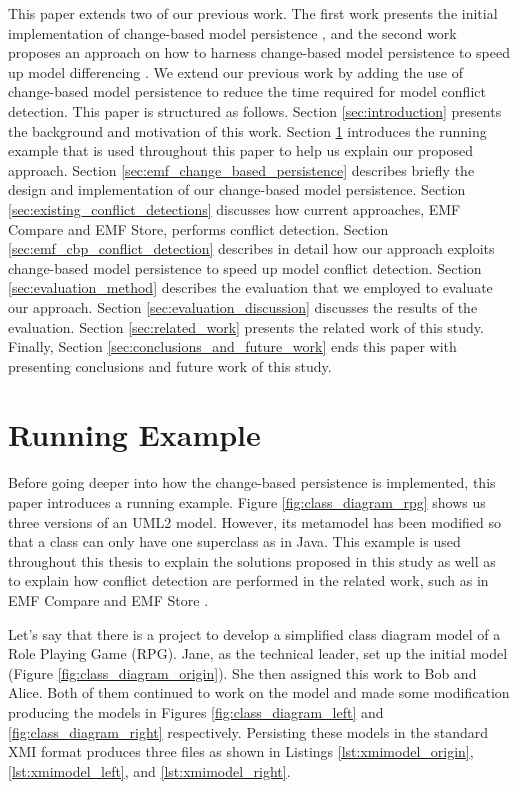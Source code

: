 This paper extends two of our previous work. The first work presents the initial implementation of change-based model persistence \cite{DBLP:conf/models/YohannisKP17}, and the second work proposes an approach on how to harness change-based model persistence to speed up model differencing \cite{yohannis2019efficient}. We extend our previous work by adding the use of change-based model persistence to reduce the time required for model conflict detection. This paper is structured as follows. Section \ref{sec:introduction} presents the background and motivation of this work. Section \ref{sec:running_example} introduces the running example that is used throughout this paper to help us explain our proposed approach. Section \ref{sec:emf_change_based_persistence} describes briefly the design and  implementation of our change-based model persistence.  
Section \ref{sec:existing_conflict_detections} discusses how current approaches, EMF Compare and EMF Store, performs conflict detection. Section \ref{sec:emf_cbp_conflict_detection} describes in detail how our approach exploits change-based model persistence to speed up model conflict detection. Section \ref{sec:evaluation_method} describes the evaluation that we employed to evaluate our approach. Section \ref{sec:evaluation_discussion} discusses the results of the evaluation. Section \ref{sec:related_work} presents the related work of this study. Finally, Section \ref{sec:conclusions_and_future_work} ends this paper with presenting conclusions and future work of this study.

\section{Running Example}
\label{sec:running_example}
Before going deeper into how the change-based persistence is implemented, this paper introduces a running example. Figure \ref{fig:class_diagram_rpg} shows us three versions of an UML2 model. However, its metamodel has been modified so that a class can only have one superclass as in Java. This example is used throughout this thesis to explain the solutions proposed in this study as well as to explain how conflict detection are performed in the related work, such as in EMF Compare \cite{emfcompare2018developer} and EMF Store \cite{emfstore2019what}. 

Let's say that there is a project to develop a simplified class diagram model of a Role Playing Game (RPG). Jane, as the technical leader, set up the initial model (Figure \ref{fig:class_diagram_origin}). She then assigned this work to Bob and Alice. Both of them continued to work on the model and made some modification producing the models in Figures \ref{fig:class_diagram_left} and \ref{fig:class_diagram_right} respectively. Persisting these models in the standard XMI \cite{omg2018xmi} format produces three files as shown in Listings \ref{lst:xmimodel_origin}, \ref{lst:xmimodel_left}, and \ref{lst:xmimodel_right}.

